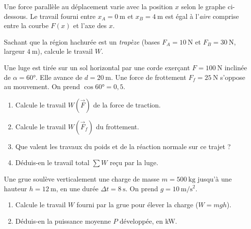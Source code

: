 \documentclass[11pt,a4paper]{article}
\newcommand{\vv}[1]{\vec{#1}}\newcommand{\ds}{\displaystyle}
\begin{document}
\begin{exo}
Une force parallèle au déplacement varie avec la position $x$ selon le graphe ci-dessous. Le travail
fourni entre $x_A=\qty{0}{\metre}$ et $x_B=\qty{4}{\metre}$ est égal à l'\emph{aire} comprise entre la
courbe $F(x)$ et l'axe des $x$.
\begin{center}
\end{center}
Sachant que la région hachurée est un \emph{trapèze} (bases $F_A=\qty{10}{\newton}$ et
$F_B=\qty{30}{\newton}$, largeur $\qty{4}{\metre}$), calcule le travail $W$.
\end{exo}

\begin{exo}
Une luge est tirée sur un sol horizontal par une corde exerçant $F=\qty{100}{\newton}$ inclinée de
$\alpha=\ang{60}$. Elle avance de $d=\qty{20}{\metre}$. Une force de frottement $F_f=\qty{25}{\newton}$
s'oppose au mouvement. On prend $\cos\ang{60}=0,5$.
\begin{enumerate}[label=\alph*)]
  \item Calcule le travail $W(\vv F)$ de la force de traction.
  \item Calcule le travail $W(\vv F_f)$ du frottement.
  \item Que valent les travaux du poids et de la réaction normale sur ce trajet ?
  \item Déduis-en le travail total $\sum W$ reçu par la luge.
\end{enumerate}
\end{exo}

\begin{exo}
Une grue soulève verticalement une charge de masse $m=\qty{500}{\kilogram}$ jusqu'à une hauteur
$h=\qty{12}{\metre}$, en une durée $\Delta t=\qty{8}{\second}$. On prend $g=\qty{10}{\metre\per\second\squared}$.
\begin{enumerate}[label=\alph*)]
  \item Calcule le travail $W$ fourni par la grue pour élever la charge ($W=mgh$).
  \item Déduis-en la puissance moyenne $P$ développée, en \si{\kilo\watt}.
\end{enumerate}
\end{exo}
\end{document}
